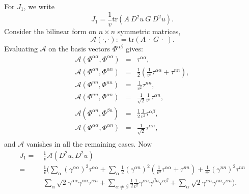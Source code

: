 \documentclass[12pt]{article}
\numberwithin{equation}{section}
\theoremstyle{plain}
\theoremstyle{definition}
\theoremstyle{remark}
\begin{document}
For $J_1$, we write
\begin{equation}
    J_1 = \frac{1}{v} \text{tr}(A\ D^2 u\ G\ D^2 u).
\end{equation}
Consider the bilinear form on $n \times n$ symmetric matrices,
\begin{equation*}
    \mathcal{A}(\cdot, \cdot) : = \text{tr}(A \ \cdot \  G\ \cdot \ ).
\end{equation*}
Evaluating $\mathcal{A}$ on the basis vectors $\Phi^{\alpha\beta}$ gives:
\begin{eqnarray*}
         \mathcal{A} (\Phi^{\alpha \alpha}, \Phi^{\alpha \alpha} ) & = &  \tau ^{\alpha \alpha}, \\
         \mathcal{A} (\Phi^{\alpha n}, \Phi^{\alpha n}) & = & \frac{1}{2} (\frac{1}{v^2} \tau ^{\alpha \alpha} + \tau^{nn} ), \\
         \mathcal{A} (\Phi^{n n}, \Phi^{n n}) & = & \frac{1}{v^2} \tau^{n n},\\
     \mathcal{A} (\Phi^{n n}, \Phi^{\alpha n} ) & = & \frac{1}{\sqrt{2}} \frac{1}{v^2} \tau^{\alpha n}, \\
     \mathcal{A} (\Phi^{\alpha n}, \Phi^{\beta n} ) & = & \frac{1}{2} \frac{1}{v^2} \tau^{\alpha \beta}, \\
     \mathcal{A} (\Phi^{\alpha \alpha}, \Phi^{\alpha n} ) & = & \frac{1}{\sqrt{2}} \tau^{\alpha n}, \\
\end{eqnarray*}
and $\mathcal{A}$ vanishes in all the remaining cases. Now
\begin{equation} \label{eq:ang_J1_est}
\begin{split}
    J_1  = & \ \frac{1}{v} \mathcal{A}(D^2 u, D^2 u) \\
     =  & \ \frac{1}{v} \Bigg( \sum_{\alpha} (\gamma^{\alpha \alpha})^2 \tau^{\alpha \alpha} +  \sum_{\alpha} \frac{1}{2}(\gamma^{\alpha n})^2  (\frac{1}{v^2} \tau^{\alpha \alpha} + \tau^{nn}) + \frac{1}{v^2} (\gamma^{n n})^2 \tau^{n n} \\
    & \ \sum_{\alpha} \sqrt{2} \gamma^{\alpha \alpha} \gamma^{\alpha n} \tau^{\alpha n} + \sum_{\alpha \neq \beta} \frac{1}{2} \frac{1}{v^2} \gamma^{\alpha n} \gamma^{\beta n} \tau^{\alpha \beta} + \sum_{\alpha}  \sqrt{2} \gamma^{\alpha n} \gamma^{n n} \tau^{\alpha n} \Bigg).
\end{split}
\end{equation}
\end{document}
